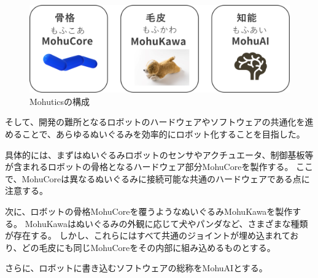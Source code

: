 \documentclass[uplatex,a4paper,12pt]{jsarticle}
\begin{document}
\begin{figure}[htbp]
  \centering
  \includegraphics[width=12cm]{images/mohutics/concept.png}
  \caption{Mohuticsの構成}
  \label{fig:mohutics:concept}
\end{figure}

そして、開発の難所となるロボットのハードウェアやソフトウェアの共通化を進めることで、あらゆるぬいぐるみを効率的にロボット化することを目指した。

具体的には、まずはぬいぐるみロボットのセンサやアクチュエータ、制御基板等が含まれるロボットの骨格となるハードウェア部分MohuCoreを製作する。
ここで、MohuCoreは異なるぬいぐるみに接続可能な共通のハードウェアである点に注意する。

次に、ロボットの骨格MohuCoreを覆うようなぬいぐるみMohuKawaを製作する。
MohuKawaはぬいぐるみの外観に応じて犬やパンダなど、さまざまな種類が存在する。
しかし、これらにはすべて共通のジョイントが埋め込まれており、どの毛皮にも同じMohuCoreをその内部に組み込めるものとする。

さらに、ロボットに書き込むソフトウェアの総称をMohuAIとする。
\end{document}
